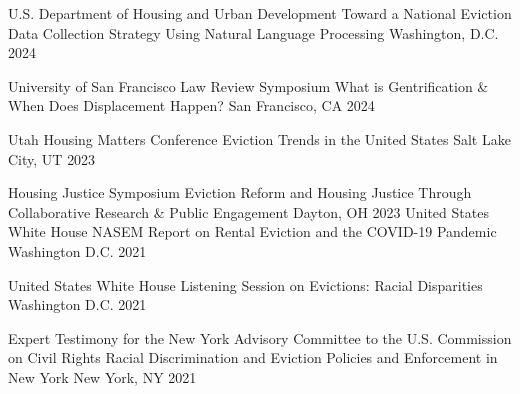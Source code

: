 


\begin{cventries}

  \cventry
    {U.S. Department of Housing and Urban Development} %
    {Toward a National Eviction Data Collection Strategy Using Natural Language Processing} %
    {Washington, D.C.} %
    {2024} %
    {}

  \cventry
    {University of San Francisco Law Review Symposium} %
    {What is Gentrification \& When Does Displacement Happen?} %
    {San Francisco, CA} %
    {2024} %
    {}
    
  \cventry
    {Utah Housing Matters Conference} %
    {Eviction Trends in the United States} %
    {Salt Lake City, UT} %
    {2023} %
    {}

  \cventry
    {Housing Justice Symposium} %
    {Eviction Reform and Housing Justice Through Collaborative Research \& Public Engagement} %
    {Dayton, OH} %
    {2023} %
    {}
  \cventry
    {United States White House} %
    {NASEM Report on Rental Eviction and the COVID-19 Pandemic} %
    {Washington D.C.} %
    {2021} %
    {}

  \cventry
    {United States White House} %
    {Listening Session on Evictions: Racial Disparities} %
    {Washington D.C.} %
    {2021} %
    {}

  \cventry
    {Expert Testimony for the New York Advisory Committee to the U.S. Commission on Civil Rights} %
    {Racial Discrimination and Eviction Policies and Enforcement in New York} %
    {New York, NY} %
    {2021} %
    {}


\end{cventries}
